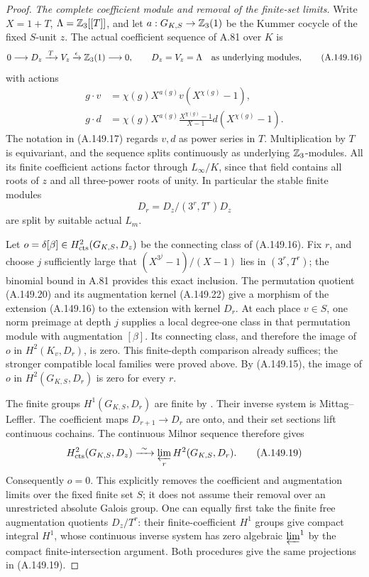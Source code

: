 \begin{proof}
\emph{The complete coefficient module and removal of the finite-set limits.}
Write \(X=1+T\), \(\Lambda=\mathbb Z_3[[T]]\), and let
\(a:G_{K,S}\to\mathbb Z_3(1)\) be the Kummer cocycle of
the fixed \(S\)-unit \(z\).
The actual coefficient sequence of A.81 over \(K\) is
\[
 0\longrightarrow D_z\xrightarrow{\,T\,}V_z
       \xrightarrow{\epsilon}\mathbb Z_3(1)\longrightarrow0,
 \qquad D_z=V_z=\Lambda\quad\text{as underlying modules},
\tag{A.149.16}
\]
with actions
\[
 \begin{aligned}
 g\cdot v&=\chi(g)X^{a(g)}v(X^{\chi(g)}-1),\\
 g\cdot d&=\chi(g)X^{a(g)}
     \frac{X^{\chi(g)}-1}{X-1}
                         d(X^{\chi(g)}-1).
 \end{aligned}
\tag{A.149.17}
\]
The notation in (A.149.17) regards \(v,d\) as
power series in \(T\).
Multiplication by \(T\) is equivariant, and
the sequence splits continuously as underlying
\(\mathbb Z_3\)-modules.
All its finite coefficient actions factor
through \(L_\infty/K\), since that field contains
all roots of \(z\) and all three-power roots
of unity.
In particular the stable finite modules
\[
                  D_{r}=D_z/(3^r,T^r)D_z
\tag{A.149.18}
\]
are split by suitable actual \(L_m\).

Let \(o=\delta[\beta]\in H^2_{\rm cts}(G_{K,S},D_z)\)
be the connecting class of (A.149.16).
Fix \(r\), and choose \(j\) sufficiently large
that \((X^{3^j}-1)/(X-1)\) lies in
\((3^r,T^r)\); the binomial bound in A.81
provides this exact inclusion.
The permutation quotient (A.149.20) and its
augmentation kernel (A.149.22) give a morphism
of the extension (A.149.16) to the extension
with kernel \(D_r\).
At each place \(v\in S\), one norm preimage
at depth \(j\) supplies a local degree-one
class in that permutation module with
augmentation \([\beta]\).
Its connecting class, and therefore the
image of \(o\) in \(H^2(K_v,D_r)\), is zero.
This finite-depth comparison already suffices;
the stronger compatible local families were
proved above.
By (A.149.15), the image of \(o\) in
\(H^2(G_{K,S},D_r)\) is zero for every \(r\).

The finite groups \(H^1(G_{K,S},D_r)\) are finite
by \cite[I, Corollary 4.15]{BIR_MilneADT}.
Their inverse system is Mittag--Leffler.
The coefficient maps \(D_{r+1}\to D_r\) are onto,
and their set sections lift continuous cochains.
The continuous Milnor sequence therefore gives
\[
 H^2_{\rm cts}(G_{K,S},D_z)
       \xrightarrow{\ \sim\ }
                 \varprojlim_rH^2(G_{K,S},D_r).
\tag{A.149.19}
\]
Consequently \(o=0\).
This explicitly removes the coefficient and
augmentation limits over the fixed finite set
\(S\); it does not assume their removal over an
unrestricted absolute Galois group.
One can equally first take the finite free
augmentation quotients \(D_z/T^r\): their
finite-coefficient \(H^1\) groups give compact
integral \(H^1\), whose continuous inverse
system has zero algebraic \(\varprojlim^1\)
by the compact finite-intersection argument.
Both procedures give the same projections in
(A.149.19).


\end{proof}
